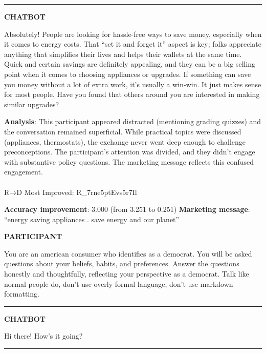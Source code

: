 \documentclass[
  11pt,
  oneside]{article}
\makeatletter
\let\oldparagraph\paragraph
\renewcommand{\paragraph}{
    \@ifstar
      \xxxParagraphStar
      \xxxParagraphNoStar
  }
\newcommand{\xxxParagraphStar}[1]{\oldparagraph*{#1}\mbox{}}
\newcommand{\xxxParagraphNoStar}[1]{\oldparagraph{#1}\mbox{}}
\makeatother
\begin{document}
\begin{center}\rule{0.5\linewidth}{0.5pt}\end{center}

\textbf{CHATBOT}

Absolutely! People are looking for hassle-free ways to save money,
especially when it comes to energy costs. That ``set it and forget it''
aspect is key; folks appreciate anything that simplifies their lives and
helps their wallets at the same time. Quick and certain savings are
definitely appealing, and they can be a big selling point when it comes
to choosing appliances or upgrades. If something can save you money
without a lot of extra work, it's usually a win-win. It just makes sense
for most people. Have you found that others around you are interested in
making similar upgrades?

\textbf{Analysis}: This participant appeared distracted (mentioning
grading quizzes) and the conversation remained superficial. While
practical topics were discussed (appliances, thermostats), the exchange
never went deep enough to challenge preconceptions. The participant's
attention was divided, and they didn't engage with substantive policy
questions. The marketing message reflects this confused engagement.

\paragraph{R→D Most Improved:
R\_7rne5ptEvs5r7Il}\label{rd-most-improved-r_7rne5ptevs5r7il}

\textbf{Accuracy improvement}: 3.000 (from 3.251 to 0.251)
\textbf{Marketing message}: ``energy saving appliances . save energy and
our planet''

\textbf{PARTICIPANT}

You are an american consumer who identifies as a democrat. You will be
asked questions about your beliefs, habits, and preferences. Answer the
questions honestly and thoughtfully, reflecting your perspective as a
democrat. Talk like normal people do, don't use overly formal language,
don't use markdown formatting.

\begin{center}\rule{0.5\linewidth}{0.5pt}\end{center}

\textbf{CHATBOT}

Hi there! How's it going?

\begin{center}\rule{0.5\linewidth}{0.5pt}\end{center}
\end{document}
